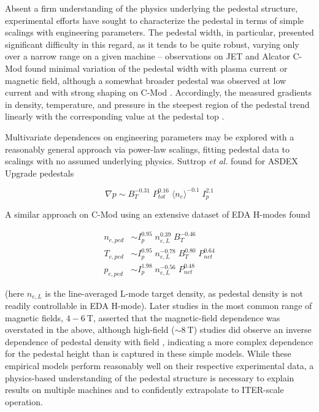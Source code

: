 Absent a firm understanding of the physics underlying the pedestal structure, experimental efforts have sought to characterize the pedestal in terms of simple scalings with engineering parameters.  The pedestal width, in particular, presented significant difficulty in this regard, as it tends to be quite robust, varying only over a narrow range on a given machine \cite{Maggi2010} -- observations on JET \cite{Breger1998} and Alcator C-Mod \cite{Hughes2002,Hughes2007a} found minimal variation of the pedestal width with plasma current or magnetic field, although a somewhat broader pedestal was observed at low current and with strong shaping on C-Mod \cite{Hughes2007,Hughes2007a}.  Accordingly, the measured gradients in density, temperature, and pressure in the steepest region of the pedestal trend linearly with the corresponding value at the pedestal top \cite{Breger1998,Hughes2007a}.

Multivariate dependences on engineering parameters may be explored with a reasonably general approach via power-law scalings, fitting pedestal data to scalings with no assumed underlying physics.  Suttrop \emph{et al.} \cite{Suttrop1997} found for ASDEX Upgrade pedestals

\begin{equation}
 \nabla p \sim B_T^{-0.31} \; P_{tot}^{0.16} \; \langle n_e \rangle^{-0.1} \; I_p^{2.1}
\end{equation}

\noindent A similar approach on C-Mod using an extensive dataset of EDA H-modes \cite{Hughes2002} found

\begin{equation}\label{eq:pedfits}
 \begin{aligned}
  n_{e,ped} &\sim I_p^{0.95} \; n_{e,L}^{0.39} \; B_T^{-0.46}\\
  T_{e,ped} &\sim I_p^{0.95} \; n_{e,L}^{-0.78} \; B_T^{0.80} \; P_{net}^{0.64}\\
  p_{e,ped} &\sim I_p^{1.98} \; n_{e,L}^{-0.56} \; P_{net}^{0.48}
 \end{aligned}
\end{equation}

\noindent (here $n_{e,L}$ is the line-averaged L-mode target density, as pedestal density is not readily controllable in EDA H-mode).  Later studies \cite{Hughes2006} in the most common range of magnetic fields, $4-\SI{6}{\tesla}$, asserted that the magnetic-field dependence was overstated in the above, although high-field ($\sim \SI{8}{\tesla}$) studies did observe an inverse dependence of pedestal density with field \cite{Hubbard2007}, indicating a more complex dependence for the pedestal height than is captured in these simple models.  While these empirical models perform reasonably well on their respective experimental data, a physics-based understanding of the pedestal structure is necessary to explain results on multiple machines and to confidently extrapolate to ITER-scale operation.

